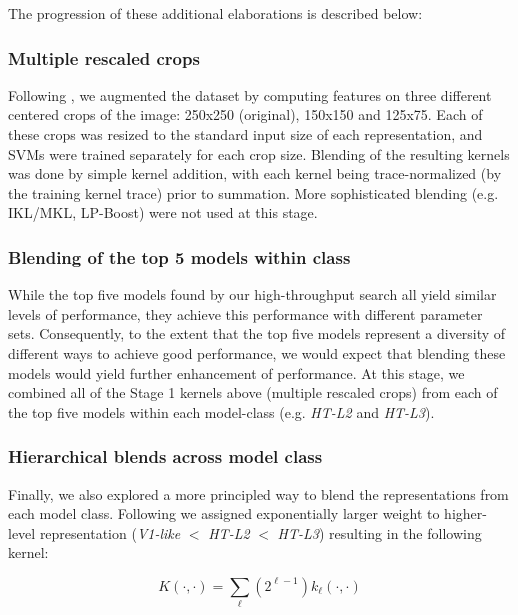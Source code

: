 The progression of these additional elaborations is described below:

\subsubsection{Multiple rescaled crops}

Following \cite{pinto:cvpr09}, we augmented the dataset by computing features on
three different centered crops of the image: 250x250 (original), 150x150 and
125x75.  Each of these crops was resized to the standard input size of each representation,
and SVMs were trained separately for each crop size.
Blending of the resulting kernels was done by simple kernel addition, with each
kernel being trace-normalized (by the training kernel trace) prior to summation.
More sophisticated blending (e.g. IKL/MKL\cite{sonnenburg2006lsm},
LP-Boost\cite{gehler:iccv09}) were not used at this stage.

\subsubsection{Blending of the top 5 models within class}

While the top five models found by our high-throughput search all yield similar
levels of performance, they achieve this performance with different parameter
sets.  Consequently, to the extent that the top five models represent a
diversity of different ways to achieve good performance, we would expect that
blending these models would yield further enhancement of performance.  At this
stage, we combined all of the Stage 1 kernels above (multiple rescaled crops) from each of the top five
models within each model-class (e.g. \emph{HT-L2} and \emph{HT-L3}).

\subsubsection {Hierarchical blends across model class}

Finally, we also explored a more principled way to blend the representations
from each model class.  Following \cite{phow} we assigned exponentially larger
weight to higher-level representation (\emph{V1-like} $<$ \emph{HT-L2} $<$
\emph{HT-L3}) resulting in the following kernel: 

\begin{equation}
K(\cdot,\cdot) =
\displaystyle\sum_{\ell} (2^{\ell-1}) k_{\ell}(\cdot, \cdot)
\end{equation}

